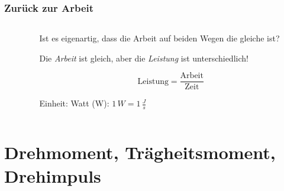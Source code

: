\documentclass{beamer}
\begin{document}

\begin{frame}
\frametitle{Zurück zur Arbeit}

 
\begin{columns}[c]

\begin{column}{5cm}

\begin{center}
\end{center}

\end{column}

\begin{column}{5cm}


Ist es eigenartig, dass die Arbeit auf beiden Wegen die gleiche ist? \pause

Die \emph{Arbeit} ist gleich, aber die \emph{Leistung} ist unterschiedlich! 

\[
\text{Leistung} = \frac{\text{Arbeit}}{\text{Zeit}}
\]

Einheit: Watt (W): \(1\,W = 1\,\frac{J}{s}\)
\end{column}



\end{columns}

\end{frame}


\section{Drehmoment, Trägheitsmoment, Drehimpuls}



\begin{frame}
\end{frame}
\end{document}
